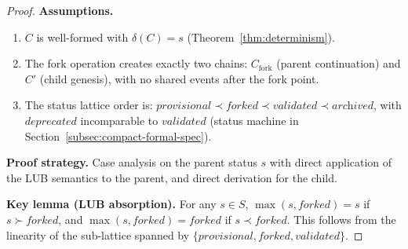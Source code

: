 \begin{proof}
\textbf{Assumptions.}
\begin{enumerate}[label=(A\arabic*),leftmargin=2em]
    \item $C$ is well-formed with $\delta(C) = s$ (Theorem~\ref{thm:determinism}).
    \item The fork operation creates exactly two chains: $C_{\text{fork}}$ (parent continuation) and $C'$ (child genesis), with no shared events after the fork point.
    \item The status lattice order is: $\textit{provisional} \prec \textit{forked} \prec \textit{validated} \prec \textit{archived}$, with $\textit{deprecated}$ incomparable to $\textit{validated}$ (status machine in Section~\ref{subsec:compact-formal-spec}).
\end{enumerate}

\textbf{Proof strategy.} Case analysis on the parent status $s$ with direct application of the LUB semantics to the parent, and direct derivation for the child.

\textbf{Key lemma (LUB absorption).} For any $s \in S$, $\max(s, \textit{forked}) = s$ if $s \succ \textit{forked}$, and $\max(s, \textit{forked}) = \textit{forked}$ if $s \prec \textit{forked}$. This follows from the linearity of the sub-lattice spanned by $\{\textit{provisional}, \textit{forked}, \textit{validated}\}$.


\end{proof}
